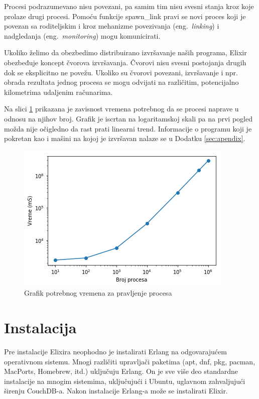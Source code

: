 \documentclass[a4paper]{article}
\begin{document}
Procesi podrazumevano nisu povezani, pa samim tim nisu svesni stanja kroz koje prolaze drugi procesi. Pomoću funkcije spawn\_link pravi se novi proces koji je povezan sa roditeljskim i kroz mehanizme povezivanja (eng.~{\em linking}) i nadgledanja (eng.~{\em monitoring}) mogu komunicirati.

Ukoliko želimo da obezbedimo distribuirano izvršavanje naših programa, Elixir obezbeđuje koncept čvorova izvršavanja. Čvorovi nisu svesni postojanja drugih dok se eksplicitno ne povežu. Ukoliko su čvorovi povezani, izvršavanje i npr. obrada rezultata jednog procesa se mogu odvijati na različitim, potencijalno kilometrima udaljenim računarima. \cite{knjigaElixir}

Na slici \ref{fig:procesi} prikazana je zavisnost vremena potrebnog da se procesi naprave u odnosu na njihov broj. Grafik je iscrtan na logaritamskoj skali pa na prvi pogled možda nije očigledno da rast prati linearni trend. Informacije o programu koji je pokretan kao i mašini na kojoj je izvršavan nalaze se u Dodatku \ref{sec:apendix}. 

\begin{figure}[h!]
\begin{center}
\includegraphics[scale=0.75]{plot.png}
\end{center}
\caption{Grafik potrebnog vremena za pravljenje procesa}
\label{fig:procesi}
\end{figure}

\section{Instalacija}
Pre instalacije Elixira neophodno je instalirati Erlang na odgovarajućem operativnom sistemu. Mnogi različiti upravljači paketima (apt, dnf, pkg, pacman, MacPorts, Homebrew, itd.) uključuju Erlang. On je sve više deo standardne instalacije na mnogim sistemima, uključujući i Ubuntu, uglavnom zahvaljujući širenju CouchDB-a. Nakon instalacije Erlang-a može se instalirati Elixir. 
\end{document}
